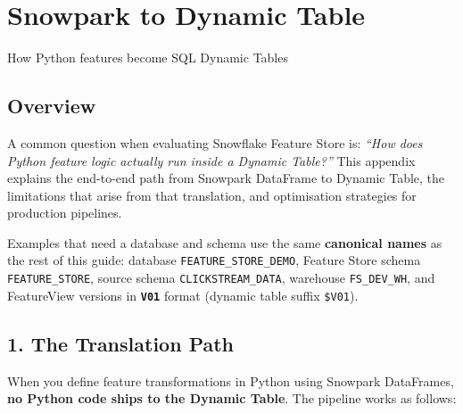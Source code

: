 \documentclass[
  letterpaper,
  DIV=11,
  numbers=noendperiod]{scrreprt}
\begin{document}
\hypertarget{snowpark-to-dynamic-table}{%
\chapter{Snowpark to Dynamic Table}\label{snowpark-to-dynamic-table}}

How Python features become SQL Dynamic Tables

\hfill\break

\hypertarget{overview-18}{%
\section{Overview}\label{overview-18}}

A common question when evaluating Snowflake Feature Store is:
\emph{``How does Python feature logic actually run inside a Dynamic
Table?''} This appendix explains the end-to-end path from Snowpark
DataFrame to Dynamic Table, the limitations that arise from that
translation, and optimisation strategies for production pipelines.

Examples that need a database and schema use the same \textbf{canonical
names} as the rest of this guide: database
\texttt{FEATURE\_STORE\_DEMO}, Feature Store schema
\texttt{FEATURE\_STORE}, source schema \texttt{CLICKSTREAM\_DATA},
warehouse \texttt{FS\_DEV\_WH}, and FeatureView versions in
\textbf{\texttt{V01}} format (dynamic table suffix \texttt{\$V01}).

\hypertarget{the-translation-path}{%
\section{1. The Translation Path}\label{the-translation-path}}

When you define feature transformations in Python using Snowpark
DataFrames, \textbf{no Python code ships to the Dynamic Table}. The
pipeline works as follows:
\end{document}
